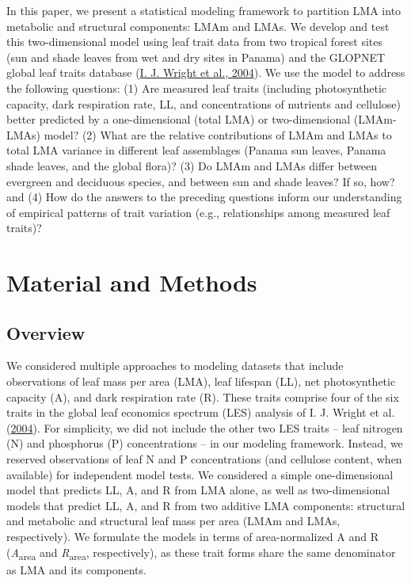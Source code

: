 \documentclass[
  12pt,
  a4paper,
,tablecaptionabove
]{scrartcl}
\begin{document}
In this paper, we present a statistical modeling framework to partition
LMA into metabolic and structural components: LMAm and LMAs. We develop
and test this two-dimensional model using leaf trait data from two
tropical forest sites (sun and shade leaves from wet and dry sites in
Panama) and the GLOPNET global leaf traits database
(\protect\hyperlink{ref-Wright2004a}{I. J. Wright et al., 2004}). We use
the model to address the following questions: (1) Are measured leaf
traits (including photosynthetic capacity, dark respiration rate, LL,
and concentrations of nutrients and cellulose) better predicted by a
one-dimensional (total LMA) or two-dimensional (LMAm-LMAs) model? (2)
What are the relative contributions of LMAm and LMAs to total LMA
variance in different leaf assemblages (Panama sun leaves, Panama shade
leaves, and the global flora)? (3) Do LMAm and LMAs differ between
evergreen and deciduous species, and between sun and shade leaves? If
so, how? and (4) How do the answers to the preceding questions inform
our understanding of empirical patterns of trait variation (e.g.,
relationships among measured leaf traits)?

\hypertarget{material-and-methods}{%
\section{Material and Methods}\label{material-and-methods}}

\hypertarget{overview}{%
\subsection{Overview}\label{overview}}

We considered multiple approaches to modeling datasets that include
observations of leaf mass per area (LMA), leaf lifespan (LL), net
photosynthetic capacity (A), and dark respiration rate (R). These traits
comprise four of the six traits in the global leaf economics spectrum
(LES) analysis of I. J. Wright et al.
(\protect\hyperlink{ref-Wright2004a}{2004}). For simplicity, we did not
include the other two LES traits -- leaf nitrogen (N) and phosphorus (P)
concentrations -- in our modeling framework. Instead, we reserved
observations of leaf N and P concentrations (and cellulose content, when
available) for independent model tests. We considered a simple
one-dimensional model that predicts LL, A, and R from LMA alone, as well
as two-dimensional models that predict LL, A, and R from two additive
LMA components: structural and metabolic and structural leaf mass per
area (LMAm and LMAs, respectively). We formulate the models in terms of
area-normalized A and R (\emph{A}\textsubscript{area} and
\emph{R}\textsubscript{area}, respectively), as these trait forms share
the same denominator as LMA and its components.
\end{document}
